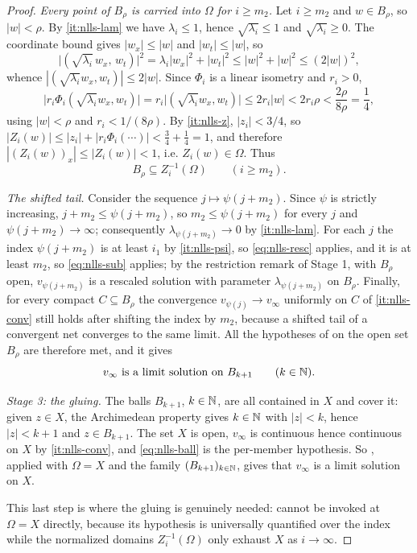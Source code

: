 \begin{proof}
\emph{Every point of $B_\rho$ is carried into $\Omega$ for $i\ge m_2$.} Let
$i\ge m_2$ and $w\in B_\rho$, so $|w|<\rho$. By \ref{it:nlls-lam} we have
$\lambda_i\le1$, hence $\sqrt{\lambda_i}\le1$ and $\sqrt{\lambda_i}\ge0$. The
coordinate bound gives $|w_x|\le|w|$ and $|w_t|\le|w|$, so
\[
  \bigl|(\sqrt{\lambda_i}\,w_x,\,w_t)\bigr|^2
   =\lambda_i|w_x|^2+|w_t|^2\le|w|^2+|w|^2\le(2|w|)^2 ,
\]
whence $|(\sqrt{\lambda_i}w_x,w_t)|\le2|w|$. Since $\Phi_i$ is a linear
isometry and $r_i>0$,
\[
  \bigl|r_i\Phi_i(\sqrt{\lambda_i}w_x,w_t)\bigr|
   =r_i\bigl|(\sqrt{\lambda_i}w_x,w_t)\bigr|
   \le 2r_i|w|<2r_i\rho<\frac{2\rho}{8\rho}=\frac14 ,
\]
using $|w|<\rho$ and $r_i<1/(8\rho)$. By \ref{it:nlls-z}, $|z_i|<3/4$, so
$|Z_i(w)|\le|z_i|+|r_i\Phi_i(\cdots)|<\tfrac34+\tfrac14=1$, and therefore
$|(Z_i(w))_x|\le|Z_i(w)|<1$, i.e. $Z_i(w)\in\Omega$. Thus
\begin{equation}\label{eq:nlls-sub}
  B_\rho\subseteq Z_i^{-1}(\Omega)\qquad(i\ge m_2).
\end{equation}

\emph{The shifted tail.} Consider the sequence $j\mapsto\psi(j+m_2)$. Since
$\psi$ is strictly increasing, $j+m_2\le\psi(j+m_2)$, so
$m_2\le\psi(j+m_2)$ for every $j$ and $\psi(j+m_2)\to\infty$; consequently
$\lambda_{\psi(j+m_2)}\to0$ by \ref{it:nlls-lam}. For each $j$ the index
$\psi(j+m_2)$ is at least $i_1$ by \ref{it:nlls-psi}, so
\eqref{eq:nlls-resc} applies, and it is at least $m_2$, so
\eqref{eq:nlls-sub} applies; by the restriction remark of Stage 1, with
$B_\rho$ open, $v_{\psi(j+m_2)}$ is a rescaled solution with parameter
$\lambda_{\psi(j+m_2)}$ on $B_\rho$. Finally, for every compact
$C\subseteq B_\rho$ the convergence $v_{\psi(j)}\to v_\infty$ uniformly on $C$
of \ref{it:nlls-conv} still holds after shifting the index by $m_2$, because a
shifted tail of a convergent net converges to the same limit. All the
hypotheses of  on the open set $B_\rho$ are
therefore met, and it gives
\begin{equation}\label{eq:nlls-ball}
  v_\infty\ \text{is a limit solution on}\ B_{k+1}\qquad(k\in\N).
\end{equation}

\emph{Stage 3: the gluing.} The balls $B_{k+1}$, $k\in\mathbb{N}$, are all contained in
$X$ and cover it: given $z\in X$, the Archimedean property gives $k\in\mathbb{N}$ with
$|z|<k$, hence $|z|<k+1$ and $z\in B_{k+1}$. The set $X$ is open, $v_\infty$ is
continuous hence continuous on $X$ by \ref{it:nlls-conv}, and
\eqref{eq:nlls-ball} is the per-member hypothesis. So
, applied with $\Omega=X$ and the family
$(B_{k+1})_{k\in\mathbb{N}}$, gives that $v_\infty$ is a limit solution on $X$.

This last step is where the gluing is genuinely needed:
 cannot be invoked at $\Omega=X$ directly,
because its hypothesis is universally quantified over the index while the
normalized domains $Z_i^{-1}(\Omega)$ only exhaust $X$ as $i\to\infty$.
\end{proof}
